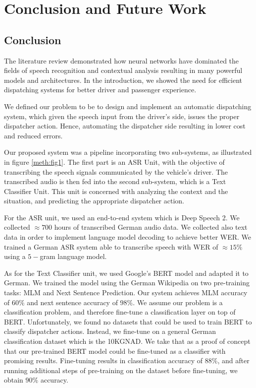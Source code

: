 \chapter{Conclusion and Future Work}
\label{chap:concl}

\section{Conclusion}
\label{conc:s1}

The literature review demonstrated how neural networks have dominated the fields of speech recognition and contextual analysis resulting in many powerful models and architectures. In the introduction, we showed the need for efficient dispatching systems for better driver and passenger experience. 

We defined our problem to be to design and implement an automatic dispatching system, which given the speech input from the driver's side, issues the proper dispatcher action. Hence, automating the dispatcher side resulting in lower cost and reduced errors. 

Our proposed system was a pipeline incorporating two sub-systems, as illustrated in figure \ref{meth:fig1}. The first part is an \acf{ASR} Unit, with the objective of transcribing the speech signals communicated by the vehicle's driver. The transcribed audio is then fed into the second sub-system, which is a Text Classifier Unit. This unit is concerned with analyzing the context and the situation, and predicting the appropriate dispatcher action.


For the \ac{ASR} unit, we used an end-to-end system which is Deep Speech 2. We collected $\approx 700$ hours of transcribed German audio data. We collected also text data in order to implement language model decoding to achieve better \ac{WER}. We trained a German \ac{ASR} system able to transcribe speech with \ac{WER} of $\approx 15\%$ using a $5-$gram language model. 

As for the Text Classifier unit, we used Google's \ac{BERT} model and adapted it to German. We trained the model using the German Wikipedia on two pre-training tasks: \acf{MLM} and Next Sentence Prediction. Our system achieves \ac{MLM} accuracy of $60\%$ and next sentence accuracy of $98\%$. We assume our problem is a classification problem, and therefore fine-tune a classification layer on top of \ac{BERT}. Unfortunately, we found no datasets that could be used to train \ac{BERT} to classify dispatcher actions. Instead, we fine-tune on a general German classification dataset which is the \acf{10KGNAD}. We take that as a proof of concept that our pre-trained \ac{BERT} model could be fine-tuned as a classifier with promising results. Fine-tuning results in classification accuracy of $88\%$, and after running additional steps of pre-training on the dataset before fine-tuning, we obtain $90\%$ accuracy.


